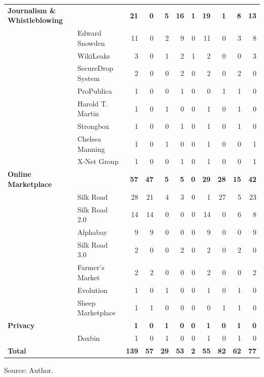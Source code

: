 {\begin{longtable}{p{1.6cm} p{1.9cm} r r r r r r r r r}
\textbf{Journalism \& Whistleblowing} & & \textbf{21} & \textbf{0} & \textbf{5} & \textbf{16} & \textbf{1} & \textbf{19} & \textbf{1} & \textbf{8} & \textbf{13} \\
 & Edward Snowden & 11 & 0 & 2 & 9 & 0 & 11 & 0 & 3 & 8 \\
 & WikiLeaks & 3 & 0 & 1 & 2 & 1 & 2 & 0 & 0 & 3 \\
 & SecureDrop System & 2 & 0 & 0 & 2 & 0 & 2 & 0 & 2 & 0 \\
 & ProPublica & 1 & 0 & 0 & 1 & 0 & 0 & 1 & 1 & 0 \\
 & Harold T. Martin & 1 & 0 & 1 & 0 & 0 & 1 & 0 & 1 & 0 \\
 & Strongbox & 1 & 0 & 0 & 1 & 0 & 1 & 0 & 1 & 0 \\
 & Chelsea Manning & 1 & 0 & 1 & 0 & 0 & 1 & 0 & 0 & 1 \\
 & X-Net Group & 1 & 0 & 0 & 1 & 0 & 1 & 0 & 0 & 1 \\
\midrule

\textbf{Online Marketplace} & & \textbf{57} & \textbf{47} & \textbf{5} & \textbf{5} & \textbf{0} & \textbf{29} & \textbf{28} & \textbf{15} & \textbf{42} \\
 & Silk Road & 28 & 21 & 4 & 3 & 0 & 1 & 27 & 5 & 23 \\
 & Silk Road 2.0 & 14 & 14 & 0 & 0 & 0 & 14 & 0 & 6 & 8 \\
 & Alphabay & 9 & 9 & 0 & 0 & 0 & 9 & 0 & 0 & 9 \\
 & Silk Road 3.0 & 2 & 0 & 0 & 2 & 0 & 2 & 0 & 2 & 0 \\
 & Farmer's Market & 2 & 2 & 0 & 0 & 0 & 2 & 0 & 0 & 2 \\
 & Evolution & 1 & 0 & 1 & 0 & 0 & 1 & 0 & 1 & 0 \\
 & Sheep Marketplace & 1 & 1 & 0 & 0 & 0 & 0 & 1 & 1 & 0 \\
\midrule

\textbf{Privacy} & & \textbf{1} & \textbf{0} & \textbf{1} & \textbf{0} & \textbf{0} & \textbf{1} & \textbf{0} & \textbf{1} & \textbf{0} \\
 & Doxbin & 1 & 0 & 1 & 0 & 0 & 1 & 0 & 1 & 0 \\
\midrule

\textbf{Total} & & \textbf{139} & \textbf{57} & \textbf{29} & \textbf{53} & \textbf{2} & \textbf{55} & \textbf{82} & \textbf{62} & \textbf{77} \\

\end{longtable}
}

\noindent Source: Author.
